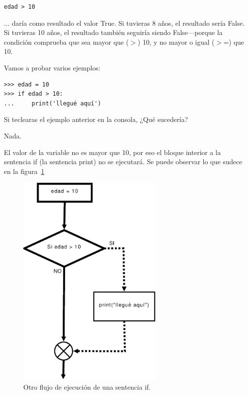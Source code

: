 \begin{listing}
\begin{verbatim}
edad > 10
\end{verbatim}
\end{listing}

$\ldots$ daría como resultado el valor True.  Si tuvieras 8 años, el resultado sería False.  Si tuvieras 10 años, el resultado también seguiría siendo False---porque la condición comprueba que sea mayor que ($>$) 10, y no mayor o igual ($>$=) que 10.

Vamos a probar varios ejemplos:

\begin{listing}
\begin{verbatim}
>>> edad = 10
>>> if edad > 10:
...     print('llegué aquí')
\end{verbatim}
\end{listing}

\noindent
Si teclearas el ejemplo anterior en la consola, ¿Qué sucedería?
\par
\noindent
Nada.
\par
\noindent
El valor de la variable  no es mayor que 10, por eso el bloque interior a la sentencia if (la sentencia print) no se ejecutará. Se puede observar lo que sudece en la figura~\ref{if2}

\begin{figure}
\begin{center}
\includegraphics[width=72mm]{if2.eps}
\end{center}
\caption{Otro flujo de ejecución de una sentencia if.}\label{if2}
\end{figure}

